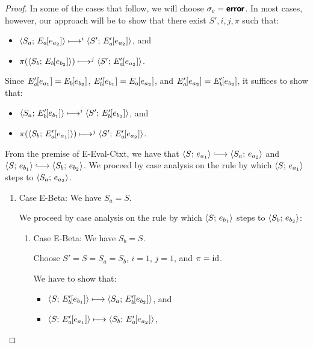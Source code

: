 \begin{proof}
  In some of the cases that follow, we will choose $\sigma_c = \textbf{\textsf{error}}$.
  In most cases, however, our approach will be to show that there
  exist $S', i, j, \pi$ such that:
  \begin{itemize}
  \item $\langle S_a;\, E_a\hspace{-1mm}\left[e_{a_2}\right] \rangle \longmapsto^i
    \langle S';\, E'_a\hspace{-1mm}\left[e_{a_2}\right] \rangle$, and
  \item $\pi(\langle S_b;\, E_b\hspace{-1mm}\left[e_{b_2}\right] \rangle) \longmapsto^j
    \langle S';\, E'_a\hspace{-1mm}\left[e_{a_2}\right] \rangle$.
  \end{itemize}
  Since $E'_a\hspace{-1mm}\left[e_{a_1}\right] = E_b\hspace{-1mm}\left[e_{b_2}\right]$,
  $E'_b\hspace{-1mm}\left[e_{b_1}\right] = E_a\hspace{-1mm}\left[e_{a_2}\right]$, and
  $E'_a\hspace{-1mm}\left[e_{a_2}\right] = E'_b\hspace{-1mm}\left[e_{b_2}\right]$, it suffices
  to show that:
  \begin{itemize}
  \item $\langle S_a;\, E'_b\hspace{-1mm}\left[e_{b_1}\right] \rangle \longmapsto^i
    \langle S';\, E'_b\hspace{-1mm}\left[e_{b_2}\right] \rangle$, and
  \item $\pi(\langle S_b;\, E'_a\hspace{-1mm}\left[e_{a_1}\right] \rangle) \longmapsto^j
    \langle S';\, E'_a\hspace{-1mm}\left[e_{a_2}\right] \rangle$.
  \end{itemize}

  From the premise of {\sc E-Eval-Ctxt}, we have that
  $\config{S}{e_{a_1}} \parstepsto \config{S_a}{e_{a_2}}$ and
  $\config{S}{e_{b_1}} \parstepsto \config{S_b}{e_{b_2}}$.  We proceed
  by case analysis on the rule by which $\langle S;\, e_{a_1} \rangle$ steps to
  $\langle S_a;\, e_{a_2} \rangle$.

  \begin{enumerate}
  \item Case {\sc E-Beta}: We have $S_a = S$.

    We proceed by case analysis on the rule by which
    $\langle S;\, e_{b_1} \rangle$ steps to $\langle S_b;\, e_{b_2} \rangle$:
    \begin{enumerate}
    \item \label{lvars-slc-beta-beta}Case {\sc E-Beta}: We have $S_b =
      S$.

      Choose $S' = S = S_a = S_b$, $i = 1$, $j = 1$, and $\pi = \mathrm{id}$.

      We have to show that:
      \begin{itemize}
      \item $\langle S;\, E'_b\hspace{-1mm}\left[e_{b_1}\right] \rangle \longmapsto
        \langle S_a;\, E'_b\hspace{-1mm}\left[e_{b_2}\right] \rangle$, and
      \item $\langle S;\, E'_a\hspace{-1mm}\left[e_{a_1}\right] \rangle \longmapsto
        \langle S_b;\, E'_a\hspace{-1mm}\left[e_{a_2}\right] \rangle$, 
      \end{itemize}


\end{enumerate}
\end{enumerate}
\end{proof}
